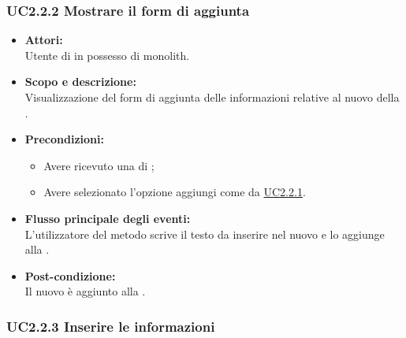 \subsubsection{UC2.2.2 Mostrare il form di aggiunta} \label{UC2.2.2}

\begin{itemize}
	\item \textbf{Attori:}
	\\Utente di  in possesso di monolith.
	\item \textbf{Scopo e descrizione:} 
	\\Visualizzazione del form di aggiunta delle informazioni relative al nuovo  della .
	\item \textbf{Precondizioni:}
	\begin{itemize}
		\item Avere ricevuto una  di ;
		\item Avere selezionato l'opzione aggiungi  come da \hyperref[UC2.2.1]{UC2.2.1}.
	\end{itemize}
	\item \textbf{Flusso principale degli eventi:}
	\\L'utilizzatore del metodo scrive il testo da inserire nel nuovo  e lo aggiunge alla .
	\item \textbf{Post-condizione:}
	\\Il nuovo  è aggiunto alla  .
\end{itemize}

\subsubsection{UC2.2.3  Inserire le informazioni} \label{UC2.2.3}

